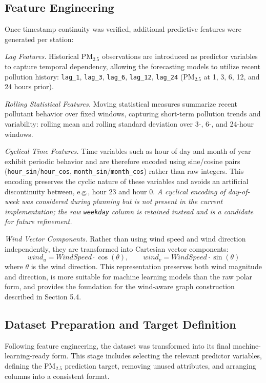 \subsection{Feature Engineering}

Once timestamp continuity was verified, additional predictive features were generated
per station:

\textit{Lag Features.} Historical PM$_{2.5}$ observations are introduced as predictor
variables to capture temporal dependency, allowing the forecasting models to utilize
recent pollution history: \texttt{lag\_1}, \texttt{lag\_3}, \texttt{lag\_6},
\texttt{lag\_12}, \texttt{lag\_24} (PM$_{2.5}$ at 1, 3, 6, 12, and 24 hours prior).

\textit{Rolling Statistical Features.} Moving statistical measures summarize recent
pollutant behavior over fixed windows, capturing short-term pollution trends and
variability: rolling mean and rolling standard deviation over 3-, 6-, and 24-hour
windows.

\textit{Cyclical Time Features.} Time variables such as hour of day and month of year
exhibit periodic behavior and are therefore encoded using sine/cosine pairs
(\texttt{hour\_sin}/\texttt{hour\_cos}, \texttt{month\_sin}/\texttt{month\_cos}) rather
than raw integers. This encoding preserves the cyclic nature of these variables and
avoids an artificial discontinuity between, e.g., hour 23 and hour 0. \textit{A
cyclical encoding of day-of-week was considered during planning but is not present in
the current implementation; the raw \texttt{weekday} column is retained instead and is
a candidate for future refinement.}

\textit{Wind Vector Components.} Rather than using wind speed and wind direction
independently, they are transformed into Cartesian vector components:
$$wind_u = WindSpeed \cdot \cos(\theta), \qquad wind_v = WindSpeed \cdot \sin(\theta)$$
where $\theta$ is the wind direction. This representation preserves both wind magnitude
and direction, is more suitable for machine learning models than the raw polar form,
and provides the foundation for the wind-aware graph construction described in
Section 5.4.

\subsection{Dataset Preparation and Target Definition}

Following feature engineering, the dataset was transformed into its final
machine-learning-ready form. This stage includes selecting the relevant predictor
variables, defining the PM$_{2.5}$ prediction target, removing unused attributes, and
arranging columns into a consistent format.

